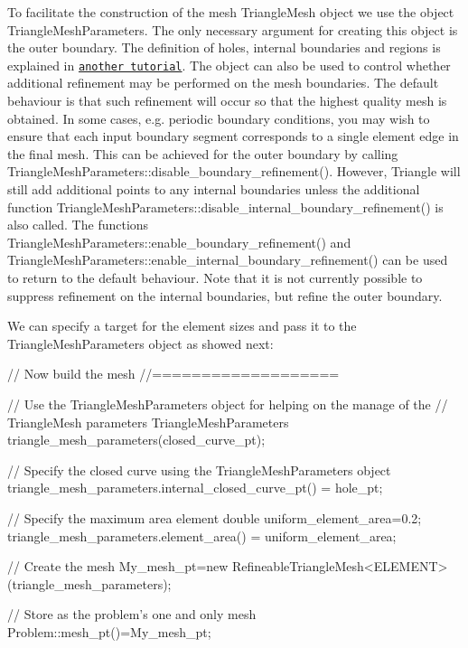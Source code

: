 To facilitate the construction of the mesh {\ttfamily Triangle\+Mesh} object we use the object {\ttfamily Triangle\+Mesh\+Parameters}. The only necessary argument for creating this object is the outer boundary. The definition of holes, internal boundaries and regions is explained in \href{../../../../doc/meshes/mesh_from_inline_triangle_internal_boundaries/html/index.html}{\tt another tutorial}. The object can also be used to control whether additional refinement may be performed on the mesh boundaries. The default behaviour is that such refinement will occur so that the highest quality mesh is obtained. In some cases, e.\+g. periodic boundary conditions, you may wish to ensure that each input boundary segment corresponds to a single element edge in the final mesh. This can be achieved for the outer boundary by calling {\ttfamily Triangle\+Mesh\+Parameters\+::disable\+\_\+boundary\+\_\+refinement()}. However, Triangle will still add additional points to any internal boundaries unless the additional function {\ttfamily Triangle\+Mesh\+Parameters\+::disable\+\_\+internal\+\_\+boundary\+\_\+refinement()} is also called. The functions {\ttfamily Triangle\+Mesh\+Parameters\+::enable\+\_\+boundary\+\_\+refinement()} and {\ttfamily Triangle\+Mesh\+Parameters\+::enable\+\_\+internal\+\_\+boundary\+\_\+refinement()} can be used to return to the default behaviour. Note that it is not currently possible to suppress refinement on the internal boundaries, but refine the outer boundary.

We can specify a target for the element sizes and pass it to the {\ttfamily Triangle\+Mesh\+Parameters} object as showed next\+:


\begin{DoxyCodeInclude}
 \textcolor{comment}{// Now build the mesh}
 \textcolor{comment}{//===================}

 \textcolor{comment}{// Use the TriangleMeshParameters object for helping on the manage of the}
 \textcolor{comment}{// TriangleMesh parameters}
 TriangleMeshParameters triangle\_mesh\_parameters(closed\_curve\_pt);

 \textcolor{comment}{// Specify the closed curve using the TriangleMeshParameters object}
 triangle\_mesh\_parameters.internal\_closed\_curve\_pt() = hole\_pt;

 \textcolor{comment}{// Specify the maximum area element}
 \textcolor{keywordtype}{double} uniform\_element\_area=0.2;
 triangle\_mesh\_parameters.element\_area() = uniform\_element\_area;
 
 \textcolor{comment}{// Create the mesh}
 My\_mesh\_pt=\textcolor{keyword}{new} 
  RefineableTriangleMesh<ELEMENT>(triangle\_mesh\_parameters);
 
 \textcolor{comment}{// Store as the problem's one and only mesh}
 Problem::mesh\_pt()=My\_mesh\_pt;

\end{DoxyCodeInclude}


